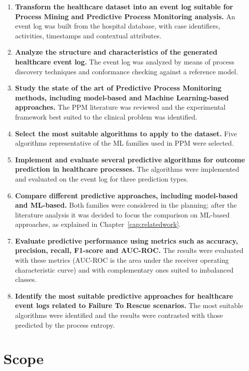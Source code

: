 \begin{enumerate}[leftmargin=*]
  \item \textbf{Transform the healthcare dataset into an event log suitable for Process Mining and Predictive Process Monitoring analysis.} An event log was built from the hospital database, with case identifiers, activities, timestamps and contextual attributes.
  \item \textbf{Analyze the structure and characteristics of the generated healthcare event log.} The event log was analyzed by means of process discovery techniques and conformance checking against a reference model.
  \item \textbf{Study the state of the art of Predictive Process Monitoring methods, including model-based and Machine Learning-based approaches.} The PPM literature was reviewed and the experimental framework best suited to the clinical problem was identified.
  \item \textbf{Select the most suitable algorithms to apply to the dataset.} Five algorithms representative of the ML families used in PPM were selected.
  \item \textbf{Implement and evaluate several predictive algorithms for outcome prediction in healthcare processes.} The algorithms were implemented and evaluated on the event log for three prediction types.
  \item \textbf{Compare different predictive approaches, including model-based and ML-based.} Both families were considered in the planning; after the literature analysis it was decided to focus the comparison on ML-based approaches, as explained in Chapter~\ref{cap:relatedwork}.
  \item \textbf{Evaluate predictive performance using metrics such as accuracy, precision, recall, F1-score and AUC-ROC.} The results were evaluated with these metrics (AUC-ROC is the area under the receiver operating characteristic curve) and with complementary ones suited to imbalanced classes.
  \item \textbf{Identify the most suitable predictive approaches for healthcare event logs related to Failure To Rescue scenarios.} The most suitable algorithms were identified and the results were contrasted with those predicted by the process entropy.
\end{enumerate}

\section{Scope}

